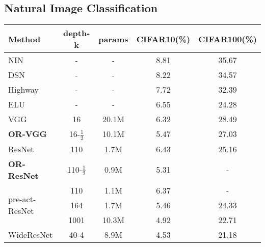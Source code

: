 \documentclass[10pt,twocolumn,letterpaper]{article}
\begin{document}
\subsection{Natural Image {Classification}}
    \begin{table}
        \begin{center}
        \footnotesize
        \setlength{\tabcolsep}{4pt}
        \begin{tabular}{|l|cccc|}
                \hline
                Method                           & depth-k & params & CIFAR10(\%)  & CIFAR100(\%)  \\ \hline\hline
                NIN \cite{Lin2014}                           & -       & -      & 8.81          & 35.67          \\
                DSN \cite{Lee2015}                           & -       & -      & 8.22          & 34.57          \\
                Highway \cite{Srivastava2015}                       & -       & -      & 7.72          & 32.39          \\
                ELU \cite{Clevert2015}                           & -       & -      & 6.55          & 24.28          \\ \hline
                VGG \cite{Simonyan2014}                           & 16      & 20.1M  & 6.32          & 28.49          \\ \hline
                \textbf{OR-VGG}                  & 16-$\tfrac{1}{2}$  & 10.1M  & 5.47          & 27.03          \\ \hline
                ResNet \cite{He2015}       & 110     & 1.7M   & 6.43          & 25.16          \\ \hline
                \textbf{OR-ResNet}               & 110-$\tfrac{1}{2}$ & 0.9M   & 5.31          & -              \\ \hline
                \multirow{3}{*}{pre-act-ResNet\cite{He2016}}   & 110     & 1.1M   & 6.37          & -              \\
                                                 & 164     & 1.7M      & 5.46          & 24.33          \\
                                                 & 1001    & 10.3M  & 4.92          & 22.71          \\ \hline
                \multirow{3}{*}{WideResNet\cite{Zagoruyko2016}}      & 40-4    & 8.9M   & 4.53          & 21.18          \\

\end{tabular}
\end{center}
\end{table}
\end{document}
